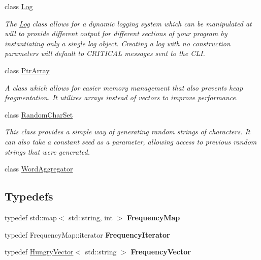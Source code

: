 \begin{DoxyCompactItemize}
class \hyperlink{classTurnLeft_1_1Utils_1_1Log}{Log}
\begin{DoxyCompactList}\small\item\em The \hyperlink{classTurnLeft_1_1Utils_1_1Log}{Log} class allows for a dynamic logging system which can be manipulated at will to provide different output for different sections of your program by instantiating only a single log object. Creating a log with no construction parameters will default to CRITICAL messages sent to the CLI. \item\end{DoxyCompactList}\item 
class \hyperlink{classTurnLeft_1_1Utils_1_1PtrArray}{PtrArray}
\begin{DoxyCompactList}\small\item\em A class which allows for easier memory management that also prevents heap fragmentation. It utilizes arrays instead of vectors to improve performance. \item\end{DoxyCompactList}\item 
class \hyperlink{classTurnLeft_1_1Utils_1_1RandomCharSet}{RandomCharSet}
\begin{DoxyCompactList}\small\item\em This class provides a simple way of generating random strings of characters. It can also take a constant seed as a parameter, allowing access to previous random strings that were generated. \item\end{DoxyCompactList}\item 
class \hyperlink{classTurnLeft_1_1Utils_1_1WordAggregator}{WordAggregator}
\end{DoxyCompactItemize}
\subsection*{Typedefs}
\begin{DoxyCompactItemize}
\item 
\hypertarget{namespaceTurnLeft_1_1Utils_a25c509095b780d24d7ce75b2ee309ca0}{
typedef std::map$<$ std::string, int $>$ {\bfseries FrequencyMap}}
\label{namespaceTurnLeft_1_1Utils_a25c509095b780d24d7ce75b2ee309ca0}

\item 
\hypertarget{namespaceTurnLeft_1_1Utils_a693d6da3c3798aef14d780fa2d1f75da}{
typedef FrequencyMap::iterator {\bfseries FrequencyIterator}}
\label{namespaceTurnLeft_1_1Utils_a693d6da3c3798aef14d780fa2d1f75da}

\item 
\hypertarget{namespaceTurnLeft_1_1Utils_a2c2f1e6f4c07f6b664a42b8b58902778}{
typedef \hyperlink{classTurnLeft_1_1Utils_1_1HungryVector}{HungryVector}$<$ std::string $>$ {\bfseries FrequencyVector}}
\label{namespaceTurnLeft_1_1Utils_a2c2f1e6f4c07f6b664a42b8b58902778}

\end{DoxyCompactItemize}
